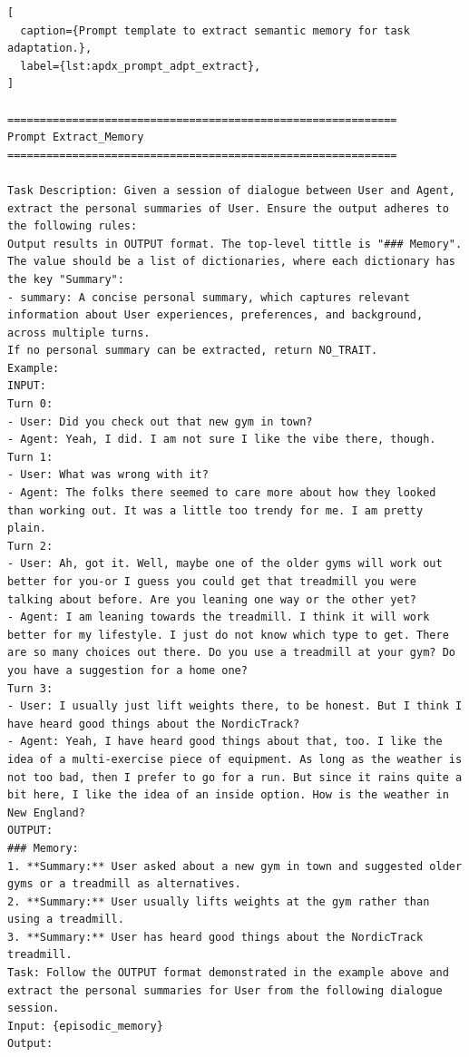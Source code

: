\begin{lstlisting}[
  caption={Prompt template to extract semantic memory for task adaptation.},
  label={lst:apdx_prompt_adpt_extract},
]

============================================================
Prompt Extract_Memory
============================================================

Task Description: Given a session of dialogue between User and Agent, extract the personal summaries of User. Ensure the output adheres to the following rules:
Output results in OUTPUT format. The top-level tittle is "### Memory". The value should be a list of dictionaries, where each dictionary has the key "Summary":
- summary: A concise personal summary, which captures relevant information about User experiences, preferences, and background, across multiple turns.
If no personal summary can be extracted, return NO_TRAIT.
Example:
INPUT:
Turn 0:
- User: Did you check out that new gym in town?
- Agent: Yeah, I did. I am not sure I like the vibe there, though.
Turn 1:
- User: What was wrong with it?
- Agent: The folks there seemed to care more about how they looked than working out. It was a little too trendy for me. I am pretty plain.
Turn 2:
- User: Ah, got it. Well, maybe one of the older gyms will work out better for you-or I guess you could get that treadmill you were talking about before. Are you leaning one way or the other yet?
- Agent: I am leaning towards the treadmill. I think it will work better for my lifestyle. I just do not know which type to get. There are so many choices out there. Do you use a treadmill at your gym? Do you have a suggestion for a home one?
Turn 3:
- User: I usually just lift weights there, to be honest. But I think I have heard good things about the NordicTrack?
- Agent: Yeah, I have heard good things about that, too. I like the idea of a multi-exercise piece of equipment. As long as the weather is not too bad, then I prefer to go for a run. But since it rains quite a bit here, I like the idea of an inside option. How is the weather in New England?
OUTPUT:
### Memory:
1. **Summary:** User asked about a new gym in town and suggested older gyms or a treadmill as alternatives.
2. **Summary:** User usually lifts weights at the gym rather than using a treadmill.
3. **Summary:** User has heard good things about the NordicTrack treadmill.
Task: Follow the OUTPUT format demonstrated in the example above and extract the personal summaries for User from the following dialogue session.
Input: {episodic_memory}
Output:

\end{lstlisting}